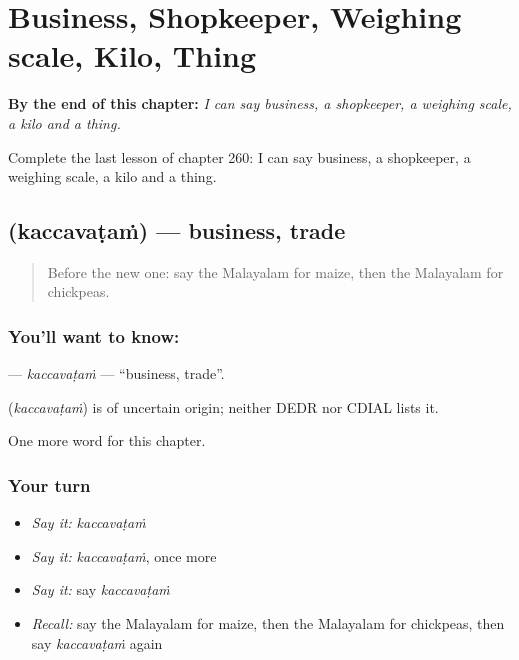 
\chapter{Business, Shopkeeper, Weighing scale, Kilo, Thing}
\label{ch:ml-business-shopkeeper-weighing-scale-kilo-thing}

\begin{chapteropening}
\textbf{By the end of this chapter:} \emph{I can say business, a shopkeeper, a weighing scale, a kilo and a thing.}

Complete the last lesson of chapter 260: I can say business, a shopkeeper, a weighing scale, a kilo and a thing.
\end{chapteropening}

\section[\texorpdfstring{\ml{കച്ചവടം} (kaccavaṭaṁ)}{കച്ചവടം (kaccavaṭaṁ)}]{ (kaccavaṭaṁ) — business, trade}

\label{lesson:ML-C260-kaccavatam}



\begin{quote}
Before the new one: say the Malayalam for maize, then the Malayalam for chickpeas.
\end{quote}

\subsection*{You'll want to know: }
\textbf{} — \emph{kaccavaṭaṁ} — \textquotedblleft{}business, trade\textquotedblright{}.

\begin{cousinweb}
\textbf{} (\emph{kaccavaṭaṁ}) is of uncertain origin; neither DEDR nor CDIAL lists it.
\end{cousinweb}

\begin{grammarlens}[title={What you've built}]
One more word for this chapter.
\end{grammarlens}

\subsection*{Your turn}
\begin{itemize}
\raggedright
  \item \emph{Say it:} \emph{kaccavaṭaṁ}
  \item \emph{Say it:} \emph{kaccavaṭaṁ}, once more
  \item \emph{Say it:} say \emph{kaccavaṭaṁ}
  \item \emph{Recall:} say the Malayalam for maize, then the Malayalam for chickpeas, then say \emph{kaccavaṭaṁ} again
\end{itemize}

